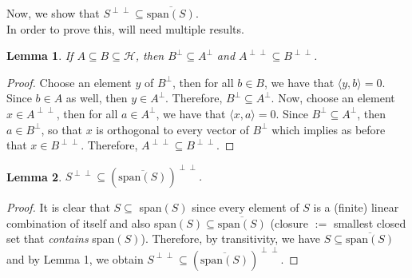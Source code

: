 \documentclass{article}
\newtheorem{lemma}{Lemma}
\begin{document}
    Now, we show that $S^{\perp\perp}\subseteq\overline{\text{span}(S)}$.\\
    In order to prove this, will need multiple results.

    \begin{lemma}
        If $A\subseteq B\subseteq \mathcal{H}$, then $B^{\perp}\subseteq A^{\perp}$ and $A^{\perp\perp}\subseteq B^{\perp\perp}$.
    \end{lemma}
    \begin{proof}
        Choose an element $y$ of $B^{\perp}$, then for all $b\in B$, we have that $\langle y,b\rangle = 0$. Since $b\in A$ as well,
        then $y\in A^{\perp}$. Therefore, $B^{\perp}\subseteq A^{\perp}$. Now, choose an element $x\in A^{\perp\perp}$, then
        for all $a\in A^{\perp}$, we have that $\langle x,a\rangle=0$. Since $B^{\perp}\subseteq A^{\perp}$, then $a\in B^{\perp}$,
        so that $x$ is orthogonal to every vector of $B^{\perp}$ which implies as before that $x\in B^{\perp\perp}$. Therefore,
        $A^{\perp\perp}\subseteq B^{\perp\perp}$.
    \end{proof}

    \begin{lemma}
        $S^{\perp\perp}\subseteq (\overline{\text{span}(S)})^{\perp\perp}$.
    \end{lemma}
    \begin{proof}
        It is clear that $S\subseteq$ span$(S)$ since every element of $S$ is a (finite) linear combination of itself and also
        span$(S)\subseteq\overline{\text{span}(S)}$ (closure $:=$ smallest closed set that \textit{contains} span$(S)$). Therefore,
        by transitivity, we have $S\subseteq\overline{\text{span}(S)}$ and by Lemma 1, we obtain 
        $S^{\perp\perp}\subseteq(\overline{\text{span}(S)})^{\perp\perp}$.
    \end{proof}
\end{document}
